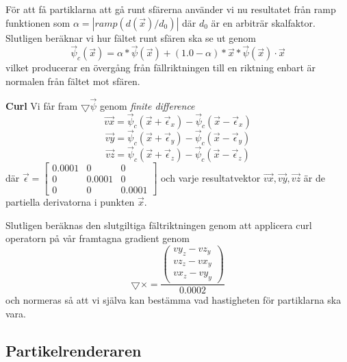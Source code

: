 \documentclass[a4paper]{article}
\begin{document}
För att få partiklarna att gå runt sfärerna använder vi nu resultatet från ramp funktionen som $\alpha = | ramp(d(\vec{x})/d_0) |$ där $d_0$  är en arbiträr skalfaktor. Slutligen beräknar vi hur fältet runt sfären ska se ut genom 
\begin{equation}
\vec{\psi}_c(\vec{x}) = \alpha * \vec{\psi}(\vec{x}) + (1.0 - \alpha) * \vec{x} * \vec{\psi}(\vec{x}) \cdot \vec{x}
\end{equation}
vilket producerar en övergång från fällriktningen till en riktning enbart är normalen från fältet mot sfären.

\textbf{Curl}
Vi får fram $\bigtriangledown \vec{\psi}$ genom \textit{finite difference}
\begin{equation}
\vec{vx} = \vec{\psi}_c(\vec{x} + \vec{\epsilon}_x  ) - \vec{\psi}_c(\vec{x} - \vec{\epsilon}_x  )
\end{equation}
\begin{equation}
\vec{vy} = \vec{\psi}_c(\vec{x} + \vec{\epsilon}_y  ) - \vec{\psi}_c(\vec{x} - \vec{\epsilon}_y  )
\end{equation}
\begin{equation}
\vec{vz} = \vec{\psi}_c(\vec{x} + \vec{\epsilon}_z  ) - \vec{\psi}_c(\vec{x} - \vec{\epsilon}_z  )
\end{equation}
där $\vec{\epsilon} = \begin{bmatrix}
0.0001 & 0 & 0\\ 
0 & 0.0001 & 0\\ 
0 & 0 & 0.0001
\end{bmatrix}$ och varje resultatvektor $\vec{vx},\vec{vy},\vec{vz}$ är de partiella derivatorna i punkten $\vec{x}$.

Slutligen beräknas den slutgiltiga fältriktningen genom att applicera curl operatorn på vår framtagna gradient genom
\begin{equation}
\bigtriangledown \times =\frac{\begin{pmatrix}
vy_z - vz_y
\\ 
vz_z - vx_y
\\ 
vx_z - vy_y
\end{pmatrix}}{0.0002}
\end{equation}
och normeras så att vi själva kan bestämma vad hastigheten för partiklarna ska vara.

        \subsection{Partikelrenderaren}
\end{document}
